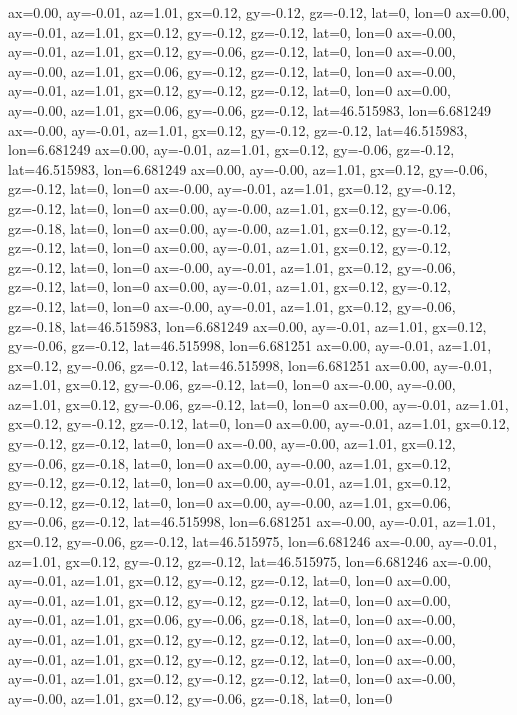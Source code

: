ax=0.00, ay=-0.01, az=1.01, gx=0.12, gy=-0.12, gz=-0.12, lat=0, lon=0
ax=0.00, ay=-0.01, az=1.01, gx=0.12, gy=-0.12, gz=-0.12, lat=0, lon=0
ax=-0.00, ay=-0.01, az=1.01, gx=0.12, gy=-0.06, gz=-0.12, lat=0, lon=0
ax=-0.00, ay=-0.00, az=1.01, gx=0.06, gy=-0.12, gz=-0.12, lat=0, lon=0
ax=-0.00, ay=-0.01, az=1.01, gx=0.12, gy=-0.12, gz=-0.12, lat=0, lon=0
ax=0.00, ay=-0.00, az=1.01, gx=0.06, gy=-0.06, gz=-0.12, lat=46.515983, lon=6.681249
ax=-0.00, ay=-0.01, az=1.01, gx=0.12, gy=-0.12, gz=-0.12, lat=46.515983, lon=6.681249
ax=0.00, ay=-0.01, az=1.01, gx=0.12, gy=-0.06, gz=-0.12, lat=46.515983, lon=6.681249
ax=0.00, ay=-0.00, az=1.01, gx=0.12, gy=-0.06, gz=-0.12, lat=0, lon=0
ax=-0.00, ay=-0.01, az=1.01, gx=0.12, gy=-0.12, gz=-0.12, lat=0, lon=0
ax=0.00, ay=-0.00, az=1.01, gx=0.12, gy=-0.06, gz=-0.18, lat=0, lon=0
ax=0.00, ay=-0.00, az=1.01, gx=0.12, gy=-0.12, gz=-0.12, lat=0, lon=0
ax=0.00, ay=-0.01, az=1.01, gx=0.12, gy=-0.12, gz=-0.12, lat=0, lon=0
ax=-0.00, ay=-0.01, az=1.01, gx=0.12, gy=-0.06, gz=-0.12, lat=0, lon=0
ax=0.00, ay=-0.01, az=1.01, gx=0.12, gy=-0.12, gz=-0.12, lat=0, lon=0
ax=-0.00, ay=-0.01, az=1.01, gx=0.12, gy=-0.06, gz=-0.18, lat=46.515983, lon=6.681249
ax=0.00, ay=-0.01, az=1.01, gx=0.12, gy=-0.06, gz=-0.12, lat=46.515998, lon=6.681251
ax=0.00, ay=-0.01, az=1.01, gx=0.12, gy=-0.06, gz=-0.12, lat=46.515998, lon=6.681251
ax=0.00, ay=-0.01, az=1.01, gx=0.12, gy=-0.06, gz=-0.12, lat=0, lon=0
ax=-0.00, ay=-0.00, az=1.01, gx=0.12, gy=-0.06, gz=-0.12, lat=0, lon=0
ax=0.00, ay=-0.01, az=1.01, gx=0.12, gy=-0.12, gz=-0.12, lat=0, lon=0
ax=0.00, ay=-0.01, az=1.01, gx=0.12, gy=-0.12, gz=-0.12, lat=0, lon=0
ax=-0.00, ay=-0.00, az=1.01, gx=0.12, gy=-0.06, gz=-0.18, lat=0, lon=0
ax=0.00, ay=-0.00, az=1.01, gx=0.12, gy=-0.12, gz=-0.12, lat=0, lon=0
ax=0.00, ay=-0.01, az=1.01, gx=0.12, gy=-0.12, gz=-0.12, lat=0, lon=0
ax=0.00, ay=-0.00, az=1.01, gx=0.06, gy=-0.06, gz=-0.12, lat=46.515998, lon=6.681251
ax=-0.00, ay=-0.01, az=1.01, gx=0.12, gy=-0.06, gz=-0.12, lat=46.515975, lon=6.681246
ax=-0.00, ay=-0.01, az=1.01, gx=0.12, gy=-0.12, gz=-0.12, lat=46.515975, lon=6.681246
ax=-0.00, ay=-0.01, az=1.01, gx=0.12, gy=-0.12, gz=-0.12, lat=0, lon=0
ax=0.00, ay=-0.01, az=1.01, gx=0.12, gy=-0.12, gz=-0.12, lat=0, lon=0
ax=0.00, ay=-0.01, az=1.01, gx=0.06, gy=-0.06, gz=-0.18, lat=0, lon=0
ax=-0.00, ay=-0.01, az=1.01, gx=0.12, gy=-0.12, gz=-0.12, lat=0, lon=0
ax=-0.00, ay=-0.01, az=1.01, gx=0.12, gy=-0.12, gz=-0.12, lat=0, lon=0
ax=-0.00, ay=-0.01, az=1.01, gx=0.12, gy=-0.12, gz=-0.12, lat=0, lon=0
ax=-0.00, ay=-0.00, az=1.01, gx=0.12, gy=-0.06, gz=-0.18, lat=0, lon=0
